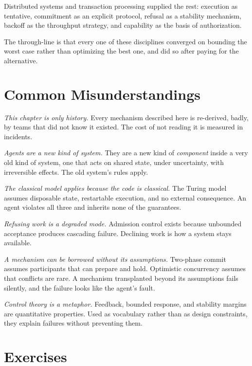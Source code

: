 \documentclass[11pt]{book}
\begin{document}
Distributed systems and transaction processing supplied the rest: execution as tentative, commitment as an explicit protocol, refusal as a stability mechanism, backoff as the throughput strategy, and capability as the basis of authorization.

The through-line is that every one of these disciplines converged on bounding the worst case rather than optimizing the best one, and did so after paying for the alternative.

\section{Common Misunderstandings}

\textit{This chapter is only history.} Every mechanism described here is re-derived, badly, by teams that did not know it existed. The cost of not reading it is measured in incidents.

\textit{Agents are a new kind of system.} They are a new kind of \textit{component} inside a very old kind of system, one that acts on shared state, under uncertainty, with irreversible effects. The old system's rules apply.

\textit{The classical model applies because the code is classical.} The Turing model assumes disposable state, restartable execution, and no external consequence. An agent violates all three and inherits none of the guarantees.

\textit{Refusing work is a degraded mode.} Admission control exists because unbounded acceptance produces cascading failure. Declining work is how a system stays available.

\textit{A mechanism can be borrowed without its assumptions.} Two-phase commit assumes participants that can prepare and hold. Optimistic concurrency assumes that conflicts are rare. A mechanism transplanted beyond its assumptions fails silently, and the failure looks like the agent's fault.

\textit{Control theory is a metaphor.} Feedback, bounded response, and stability margins are quantitative properties. Used as vocabulary rather than as design constraints, they explain failures without preventing them.

\section*{Exercises}
\end{document}
